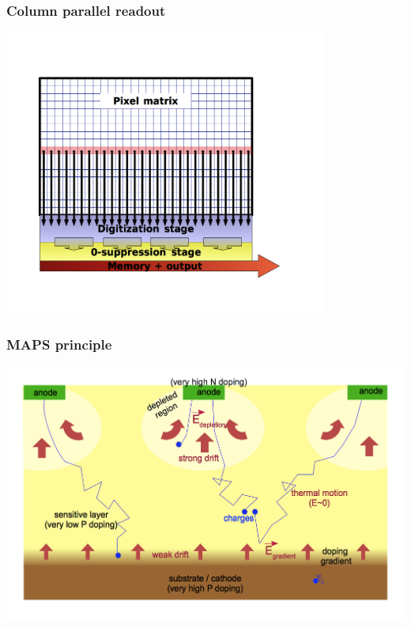 \documentclass{beamer}
\begin{document}
  \begin{frame}[plain]
    \frametitle{Column parallel readout}

    \begin{center}
      \includegraphics[width = 0.8\textwidth]{Pictures/parallelColumnPrinciple_2bis.png}
    \end{center}
  \end{frame}


  \begin{frame}[plain]
    \frametitle{MAPS principle}

    \begin{center}
      \includegraphics[width = \textwidth]{Pictures/collectionEfield.png}
    \end{center}
  \end{frame}
\end{document}
